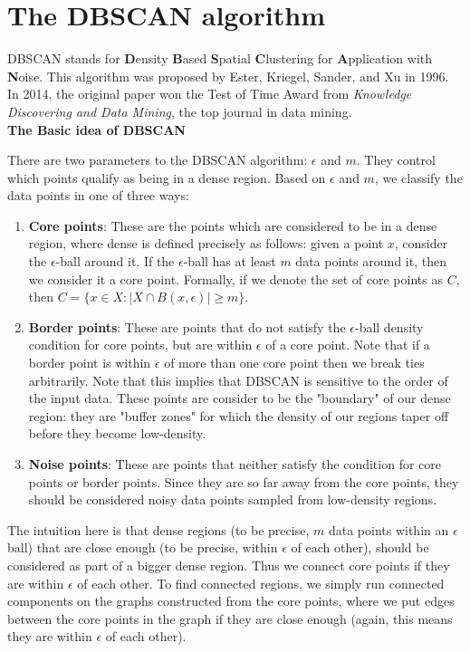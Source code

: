 \section{The DBSCAN algorithm}
  DBSCAN stands for \textbf{D}ensity \textbf{B}ased \textbf{S}patial
  \textbf{C}lustering  for \textbf{A}pplication with \textbf{N}oise. This
  algorithm was proposed by Ester, Kriegel, Sander, and Xu in 1996. In 2014,
  the original paper won the Test of Time Award from \textit{Knowledge Discovering and Data Mining},
  the top journal in data mining.\\

  \noindent\textbf{The Basic idea of DBSCAN}
  
  There are two parameters to the DBSCAN algorithm: $\epsilon$ and $m$. They control 
  which points qualify as being in a dense region. Based on $\epsilon$
  and $m$, we classify the data points in one of three ways:

  \begin{enumerate}
  \item \textbf{Core points}: These are the points which are considered to be in a
  dense region, where dense is defined precisely as follows: given a point $x$,
  consider the $\epsilon$-ball around it. If the $\epsilon$-ball has
  at least $m$ data points around it, then we consider it a core point. Formally,
  if we denote the set of core points as $C$, then $C=\{x \in X: |X \cap B(x,\epsilon)|\geq m\}$.
  \item \textbf{Border points}: These are points that do not satisfy the $\epsilon$-ball
  density condition for core points, but are within $\epsilon$ of a core point.
  Note that if a border point is within $\epsilon$ of more than one core point
  then we break ties arbitrarily. Note that this implies that DBSCAN is sensitive
  to the order of the input data. These points are consider to be the "boundary"
  of our dense region: they are "buffer zones" for which the density of our regions
  taper off before they become low-density.
  \item \textbf{Noise points}: These are points that neither satisfy the condition for
  core points or border points. Since they are so far away from the core points,
  they should be considered noisy data points sampled from low-density regions.
  \end{enumerate}

  The intuition here is that dense regions (to be precise, $m$ data points within
  an $\epsilon$ ball) that are close enough (to be precise, within $\epsilon$ of each other),
  should be considered as part of a bigger dense region. Thus we connect core
  points if they are within $\epsilon$ of each other. To find connected regions,
  we simply run connected components on the graphs constructed from the core
  points, where we put edges between the core points in the graph if they are
  close enough (again, this means they are within $\epsilon$ of each other).

